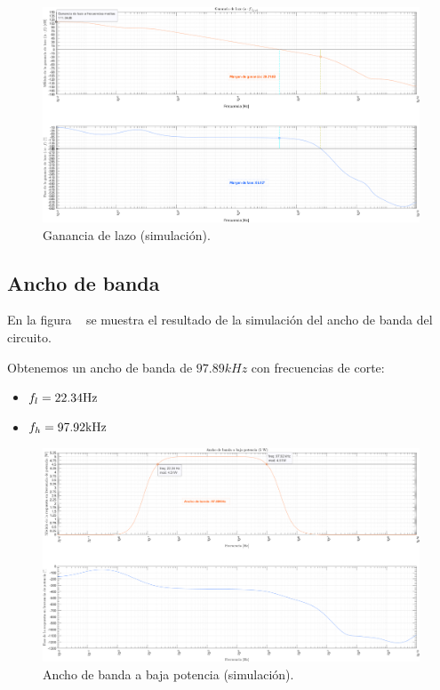 \begin{figure}[H]
    \centering
    \includegraphics[height=0.66 \textwidth, angle=90]{./img/simulaciones/Loop/gain_loop.png}
    \caption{Ganancia de lazo (simulación).}
    \label{fig:gain_loop_sim}
\end{figure}

\clearpage

\subsection{Ancho de banda}

\par En la figura ~ se muestra el resultado de la simulación del ancho de banda del circuito.
\par Obtenemos un ancho de banda de $97.89kHz$ con frecuencias de corte:

\begin{itemize}
    \item $f_l =22.34 \si[per-mode=symbol]{\hertz}$
    \item $f_h =97.92 \si[per-mode=symbol]{\kilo\hertz}$
\end{itemize}

\vfill

\clearpage

\begin{figure}[H]
    \centering
    \includegraphics[height=0.66 \textwidth, angle=90]{./img/simulaciones/BW/Low_power_BW.png}    \caption{Ancho de banda a baja potencia (simulación).}
    \label{fig:Low_power_BW}
\end{figure}


